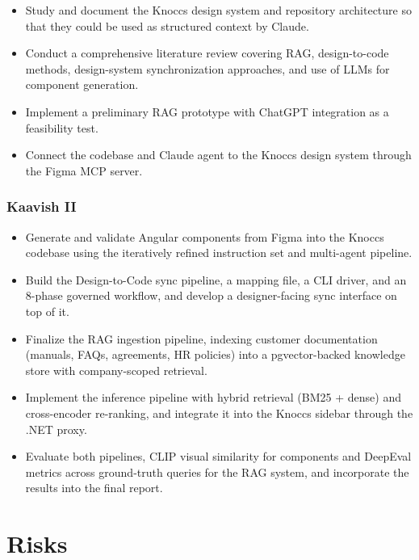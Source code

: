 \begin{itemize}
    \item Study and document the Knoccs design system and repository architecture so that they could be used as structured context by Claude.
    \item Conduct a comprehensive literature review covering RAG, design-to-code methods, design-system synchronization approaches, and use of LLMs for component generation.
    \item Implement a preliminary RAG prototype with ChatGPT integration as a feasibility test.
    \item Connect the codebase and Claude agent to the Knoccs design system through the Figma MCP server.
\end{itemize}

\subsubsection{Kaavish II}

\begin{itemize}
    \item Generate and validate Angular components from Figma into the Knoccs codebase using the iteratively refined instruction set and multi-agent pipeline.
    \item Build the Design-to-Code sync pipeline, a mapping file, a CLI driver, and an 8-phase governed workflow, and develop a designer-facing sync interface on top of it.
    \item Finalize the RAG ingestion pipeline, indexing customer documentation (manuals, FAQs, agreements, HR policies) into a pgvector-backed knowledge store with company-scoped retrieval.
    \item Implement the inference pipeline with hybrid retrieval (BM25 + dense) and cross-encoder re-ranking, and integrate it into the Knoccs sidebar through the .NET proxy.
    \item Evaluate both pipelines, CLIP visual similarity for components and DeepEval metrics across ground-truth queries for the RAG system, and incorporate the results into the final report.
\end{itemize}

\section{Risks}
\label{sec:risks}

